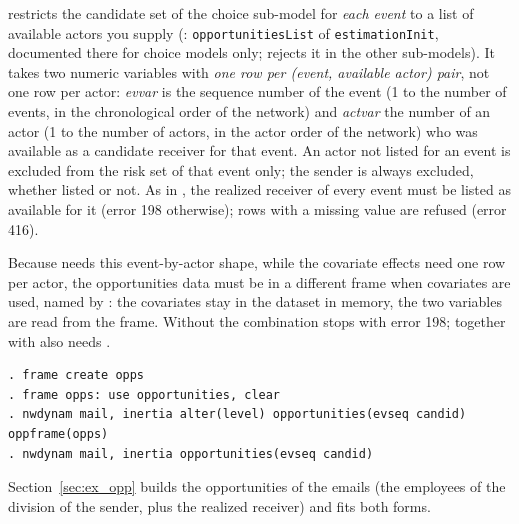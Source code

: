  restricts the candidate set of the choice sub-model for \emph{each event} to a list of available actors you supply (\goldfish{}: \texttt{opportunitiesList} of \texttt{estimationInit}, documented there for choice models only; \nwdynam{} rejects it in the other sub-models). It takes two numeric variables with \emph{one row per (event, available actor) pair}, not one row per actor: \emph{evvar} is the sequence number of the event (1 to the number of events, in the chronological order of the network) and \emph{actvar} the number of an actor (1 to the number of actors, in the actor order of the network) who was available as a candidate receiver for that event. An actor not listed for an event is excluded from the risk set of that event only; the sender is always excluded, whether listed or not. As in \goldfish{}, the realized receiver of every event must be listed as available for it (error 198 otherwise); rows with a missing value are refused (error 416).

Because  needs this event-by-actor shape, while the covariate effects need one row per actor, the opportunities data must be in a different frame when covariates are used, named by : the covariates stay in the dataset in memory, the two variables are read from the frame. Without  the combination stops with error 198;  together with  also needs .
\begin{lstlisting}
. frame create opps
. frame opps: use opportunities, clear
. nwdynam mail, inertia alter(level) opportunities(evseq candid) oppframe(opps)
. nwdynam mail, inertia opportunities(evseq candid)
\end{lstlisting}
Section~\ref{sec:ex_opp} builds the opportunities of the emails (the employees of the division of the sender, plus the realized receiver) and fits both forms.
